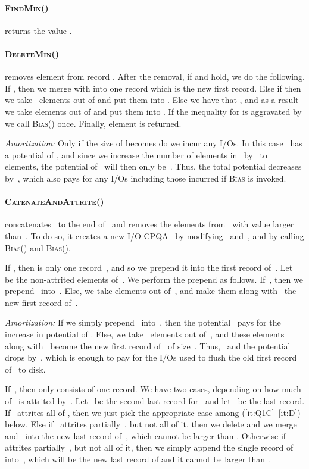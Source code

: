 \documentclass[]{article}
\begin{document}
\paragraph{\textsc{FindMin}()} returns the value . 

\paragraph{\textsc{DeleteMin}()} removes element 
from record . After the removal, if  and  hold, we do the following. If ,
then we merge  with  into one record which
is the new first record. Else if  then we
take~ elements out of  and put them into .
Else we have that , and as a result we take 
elements out of  and put them into . If the
inequality for  is aggravated by  we call \textsc{Bias}() once.
Finally, element  is returned. 

\noindent \textit{Amortization:} Only if the size of  becomes
 do we incur any I/Os. In this case~ has a
potential of , and since we increase the number of elements
in~ by~ to~ elements, the potential of~ will then only
be~. Thus, the total potential decreases by~, which also pays
for any I/Os including those incurred if \textsc{Bias} is invoked.

\paragraph{\textsc{CatenateAndAttrite}()} concatenates~ to the
end of~ and removes the elements from~ with value larger
than~. To do so, it creates a new I/O-CPQA~ by modifying~
and~, and by calling \textsc{Bias}() and \textsc{Bias}().

If , then  is only one record~, and so we prepend
it into the first record  of~.  Let~ be
the non-attrited elements of~. We perform the prepend as follows.
If~, then we prepend~ into~. Else, we take
 elements out of~, and make them along with~ the new
first record of~.

\noindent \textit{Amortization:} If we simply prepend~ into~, then
the potential~ pays for the increase in potential of
. Else, we take~ elements out of~,
and these elements along with~ become the new first record of~ of
size~. Thus,~ and the potential drops by~, which is
enough to pay for the I/Os used to flush the old first record of~ to
disk.

\noindent If~, then  only consists of one record. We have two
cases, depending on how much of~ is attrited by~. Let~ be the
second last record for~ and let~ be the last record.
If~ attrites all of , then we just pick the appropriate case among
(\ref{it:Q1C}--\ref{it:D}) below. Else if~ attrites partially~, but not
all of it, then we delete  and we merge~ and~ into the new last
record of~, which cannot be larger than . Otherwise if~ attrites
partially~, but not all of it, then we simply append the single record
of~ into~, which will be the new last record of  and it cannot be
larger than .
\end{document}
